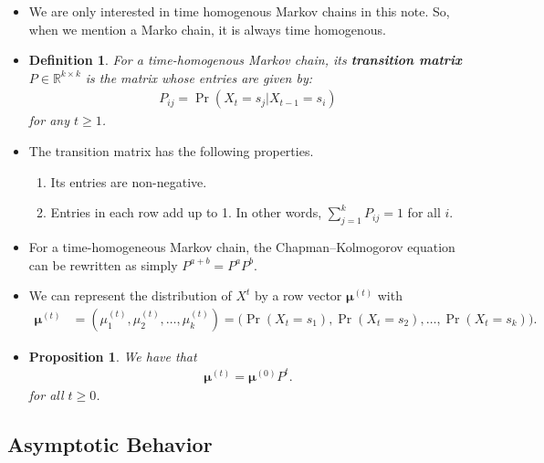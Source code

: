 \documentclass[10pt]{article}
\newtheorem{definition}[lemma]{Definition}
\newtheorem{proposition}[lemma]{Proposition}
\newcommand{\ves}[1]{\boldsymbol{#1}}
\newcommand{\Real}{\mathbb{R}}
\begin{document}
\begin{itemize}
  \item We are only interested in time homogenous Markov chains in this note. So, when we mention a Marko chain, it is always time homogenous.
  
  \item \begin{definition}
    For a time-homogenous Markov chain, its {\bf transition matrix} $P \in \Real^{k \times k}$ is the matrix whose entries are given by:
    \begin{align*}
        P_{ij} = \Pr(X_t = s_j | X_{t-1} = s_i)
    \end{align*}
    for any $t \geq 1$.
  \end{definition}

  \item The transition matrix has the following properties.
  \begin{enumerate}
    \item Its entries are non-negative.
    \item Entries in each row add up to 1. In other words,
    $\sum_{j=1}^k P_{ij} = 1$
    for all $i$.
  \end{enumerate}

  \item For a time-homogeneous Markov chain, the Chapman--Kolmogorov equation can be rewritten as simply $P^{a+b} = P^a P^b$.
  
  \item We can represent the distribution of $X^t$ by a row vector $\ves{\mu}^{(t)}$ with
  \begin{align*}
      \ves{\mu}^{(t)} 
      &= (\mu^{(t)}_1, \mu^{(t)}_2, \dotsc, \mu^{(t)}_k) 
      = \Big( \Pr(X_t = s_1), \Pr(X_t = s_2), \dotsc, \Pr(X_t = s_k) \Big).
  \end{align*}

  \item \begin{proposition}
    We have that
    \begin{align*}
      \ves{\mu}^{(t)} = \ves{\mu}^{(0)} P^t.
    \end{align*}
    for all $t \geq 0$.
  \end{proposition}  
\end{itemize}

\subsection{Asymptotic Behavior}
\end{document}
